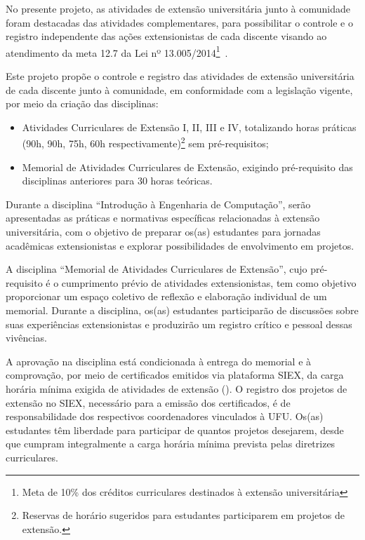 No presente projeto, as atividades de extensão universitária junto à comunidade foram destacadas das atividades complementares, para possibilitar o controle e o registro independente das ações extensionistas de cada discente visando ao atendimento da meta 12.7 da Lei nº 13.005/2014\footnote{Meta de 10\% dos créditos curriculares destinados à extensão universitária}~\cite{Lei:13005:2014}.

Este projeto propõe o controle e registro das atividades de extensão universitária de cada discente junto à comunidade, em conformidade com a legislação vigente, por meio da criação das disciplinas:

\begin{itemize}
    \item Atividades Curriculares de Extensão I, II, III e IV, totalizando horas práticas (90h, 90h, 75h, 60h respectivamente)\footnote{Reservas de horário sugeridos para estudantes participarem em projetos de extensão.} sem pré-requisitos;
    \item Memorial de Atividades Curriculares de Extensão, exigindo pré-requisito das disciplinas anteriores para 30 horas teóricas.
\end{itemize}

Durante a disciplina ``Introdução à Engenharia de Computação'', serão apresentadas as práticas e normativas específicas relacionadas à extensão universitária, com o objetivo de preparar os(as) estudantes para jornadas acadêmicas extensionistas e explorar possibilidades de envolvimento em projetos.

A disciplina ``Memorial de Atividades Curriculares de Extensão'', cujo pré-requisito é o cumprimento prévio de atividades extensionistas, tem como objetivo proporcionar um espaço coletivo de reflexão e elaboração individual de um memorial. Durante a disciplina, os(as) estudantes participarão de discussões sobre suas experiências extensionistas e produzirão um registro crítico e pessoal dessas vivências.

A aprovação na disciplina está condicionada à entrega do memorial e à comprovação, por meio de certificados emitidos via plataforma SIEX, da carga horária mínima exigida de atividades de extensão (\unskip). O registro dos projetos de extensão no SIEX, necessário para a emissão dos certificados, é de responsabilidade dos respectivos coordenadores vinculados à UFU. Os(as) estudantes têm liberdade para participar de quantos projetos desejarem, desde que cumpram integralmente a carga horária mínima prevista pelas diretrizes curriculares.

